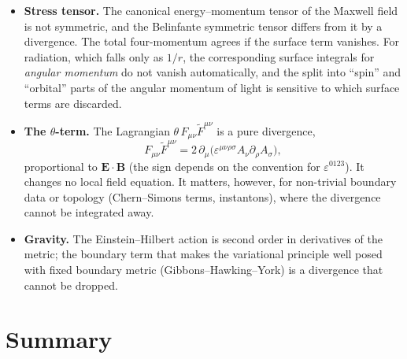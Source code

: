 \begin{itemize}
\item \textbf{Stress tensor.} The canonical energy--momentum tensor of the
Maxwell field is not symmetric, and the Belinfante symmetric tensor differs
from it by a divergence. The total four-momentum agrees if the surface term
vanishes. For radiation, which falls only as $1/r$, the corresponding
surface integrals for \emph{angular momentum} do not vanish automatically,
and the split into ``spin'' and ``orbital'' parts of the angular
momentum of light is sensitive to which surface terms are discarded.
\item \textbf{The $\theta$-term.} The Lagrangian $\theta\,F_{\mu\nu}\tilde F^{\mu\nu}$ is a pure divergence,
\begin{equation*}
F_{\mu\nu}\tilde F^{\mu\nu}=2\,\partial_\mu\big(\varepsilon^{\mu\nu\rho\sigma}A_\nu\partial_\rho A_\sigma\big),
\end{equation*}
proportional to $\mathbf E\cdot\mathbf B$ (the sign depends on the convention
for $\varepsilon^{0123}$). It changes no local field equation. It matters,
however, for non-trivial boundary data or topology (Chern--Simons terms,
instantons), where the divergence cannot be integrated away.
\item \textbf{Gravity.} The Einstein--Hilbert action is second order in
derivatives of the metric; the boundary term that makes the variational
principle well posed with fixed boundary metric (Gibbons--Hawking--York) is
a divergence that cannot be dropped.
\end{itemize}

\section{Summary}
\label{sec:mb-summary}

